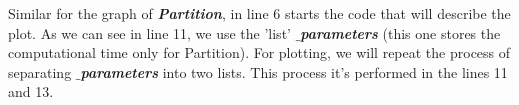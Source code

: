 Similar for the graph of {\bfseries\itshape Partition}, in line 6 starts the code that will describe the plot. As we can see in line 11, we use the 'list' {\bfseries\itshape $\_$parameters} (this one stores the computational time only for Partition). For plotting, we will repeat the process of separating {\bfseries\itshape $\_$parameters} into two lists. This process it's performed in the lines 11 and 13. \hfill \break

\pagebreak